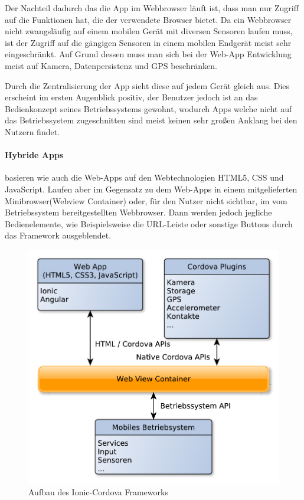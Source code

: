 Der Nachteil dadurch das die App im Webbrowser läuft ist, dass man nur Zugriff auf die Funktionen hat, die der verwendete Browser bietet. Da ein Webbrowser nicht zwangsläufig auf einem mobilen Gerät mit diversen Sensoren laufen muss, ist der Zugriff auf die gängigen Sensoren in einem mobilen Endgerät meist sehr eingeschränkt. Auf Grund dessen muss man sich bei der Web-App Entwicklung meist auf Kamera, Datenpersistenz und GPS beschränken.

Durch die Zentralisierung der App sieht diese auf jedem Gerät gleich aus. Dies erscheint im ersten Augenblick positiv, der Benutzer jedoch ist an das Bedienkonzept seines Betriebssystems gewohnt, wodurch Apps welche nicht auf das Betriebssystem zugeschnitten sind meist keinen sehr großen Anklang bei den Nutzern findet. 

\paragraph{Hybride Apps}\label{Hybride Apps} basieren wie auch die Web-Apps auf den Webtechnologien HTML5, CSS und JavaScript. Laufen aber im Gegensatz zu dem Web-Apps in einem mitgelieferten Minibrowser(Webview Container) oder, für den Nutzer nicht sichtbar, im vom Betriebssystem bereitgestellten Webbrowser. Dann werden jedoch jegliche Bedienelemente, wie Beispielsweise die URL-Leiste oder sonstige Buttons durch das Framework ausgeblendet.

\begin{figure}[H]
	\centering
	\includegraphics[scale=0.8]{images/IonicCordova}
	\caption[Aufbau des Ionic-Cordova Frameworks]{Aufbau des Ionic-Cordova Frameworks}
	\label{IonicCordova}
\end{figure}

